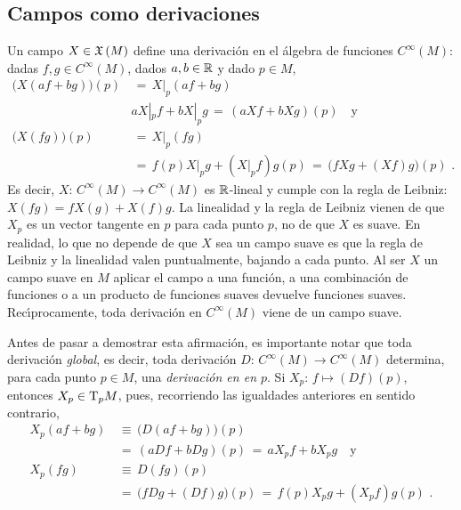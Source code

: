 \subsection{Campos como derivaciones}
Un campo $X\in\mathfrak{X}\left(M\right)$ define una derivaci\'{o}n en el \'{a}lgebra
de funciones $C^{\infty}(M)$: dadas $f,g\in C^{\infty}(M)$, dados
$a,b\in\mathbb{R}$ y dado $p\in M$,
\begin{align*}
	\big(X(af+bg)\big)(p) & \,=\,X|_{p}(af+bg) \\
	& aX|_{p}f+bX|_{p}g \,=\,(aXf+bXg)(p)
		\quad\text{y} \\
	\big(X(fg)\big)(p) & \,=\,X|_{p}(fg) \\
	& \,=\,f(p)X|_{p}g + (X|_{p}f)g(p)
		\,=\,\big(fXg+(Xf)g\big)(p)
	\text{ .}
\end{align*}
%
Es decir, $X:\,C^{\infty}(M)\rightarrow C^{\infty}(M)$ es $\mathbb{R}$-lineal
y cumple con la regla de Leibniz: $X(fg)=fX(g)+X(f)g$. La linealidad
y la regla de Leibniz vienen de que $X_{p}$ es un vector tangente en $p$
para cada punto $p$, no de que $X$ es suave. En realidad, lo que no depende
de que $X$ sea un campo suave es que la regla de Leibniz y la linealidad
valen puntualmente, bajando a cada punto. Al ser $X$ un campo suave en $M$
aplicar el campo a una funci\'{o}n, a una combinaci\'{o}n de funciones o
a un producto de funciones suaves devuelve funciones suaves.
Rec\'{\i}procamente, toda derivaci\'{o}n en $C^{\infty}(M)$ viene de un
campo suave.

\begin{obsDerivacionEsDerivacion}\label{obs:derivacionesderivacion}
	Antes de pasar a demostrar esta afirmaci\'{o}n, es importante
	notar que toda derivaci\'{o}n \emph{global}, es decir,
	toda derivaci\'{o}n $D:\,C^{\infty}(M)\rightarrow C^{\infty}(M)$
	determina, para cada punto $p\in M$, una \emph{derivaci\'{o}n en %
	en $p$}. Si $X_{p}:\,f\mapsto (Df)(p)$, entonces
	$X_{p}\in\tangente[p]{M}$, pues, recorriendo las igualdades
	anteriores en sentido contrario,
	\begin{align*}
		X_{p}(af+bg) & \,\equiv\, \big(D(af+bg)\big)(p) \\
		& \,=\, (aDf+bDg)(p) \,=\,aX_{p}f+bX_{p}g
		\quad\text{y} \\
		X_{p}(fg) & \,\equiv\,D(fg)(p) \\
		& \,=\,\big(fDg+(Df)g\big)(p) \,=\,
			f(p)X_{p}g +(X_{p}f)g(p)
		\text{ .}
	\end{align*}
\end{obsDerivacionEsDerivacion}

